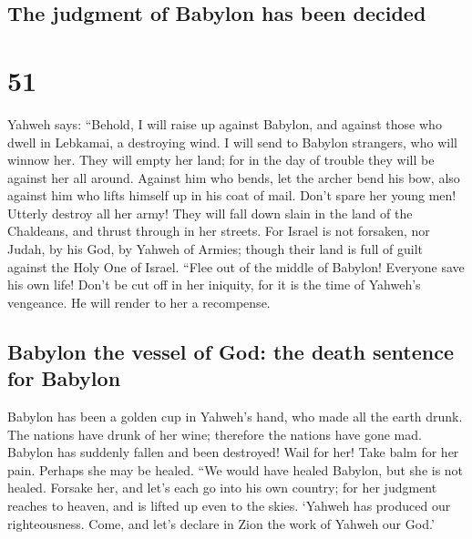 \hypertarget{the-judgment-of-babylon-has-been-decided}{%
\subsection{The judgment of Babylon has been
decided}\label{the-judgment-of-babylon-has-been-decided}}

\hypertarget{section-50}{%
\section{51}\label{section-50}}

 Yahweh says: ``Behold, I will raise up against Babylon,
and against those who dwell in Lebkamai, a destroying wind.
 I will send to Babylon strangers, who will winnow her.
They will empty her land; for in the day of trouble they will be against
her all around.  Against him who bends, let the archer
bend his bow, also against him who lifts himself up in his coat of mail.
Don't spare her young men! Utterly destroy all her army! 
They will fall down slain in the land of the Chaldeans, and thrust
through in her streets.  For Israel is not forsaken, nor
Judah, by his God, by Yahweh of Armies; though their land is full of
guilt against the Holy One of Israel.  ``Flee out of the
middle of Babylon! Everyone save his own life! Don't be cut off in her
iniquity, for it is the time of Yahweh's vengeance. He will render to
her a recompense.

\hypertarget{babylon-the-vessel-of-god-the-death-sentence-for-babylon}{%
\subsection{Babylon the vessel of God: the death sentence for
Babylon}\label{babylon-the-vessel-of-god-the-death-sentence-for-babylon}}

 Babylon has been a golden cup in Yahweh's hand, who made
all the earth drunk. The nations have drunk of her wine; therefore the
nations have gone mad.  Babylon has suddenly fallen and
been destroyed! Wail for her! Take balm for her pain. Perhaps she may be
healed.  ``We would have healed Babylon, but she is not
healed. Forsake her, and let's each go into his own country; for her
judgment reaches to heaven, and is lifted up even to the skies.
 `Yahweh has produced our righteousness. Come, and let's
declare in Zion the work of Yahweh our God.'

